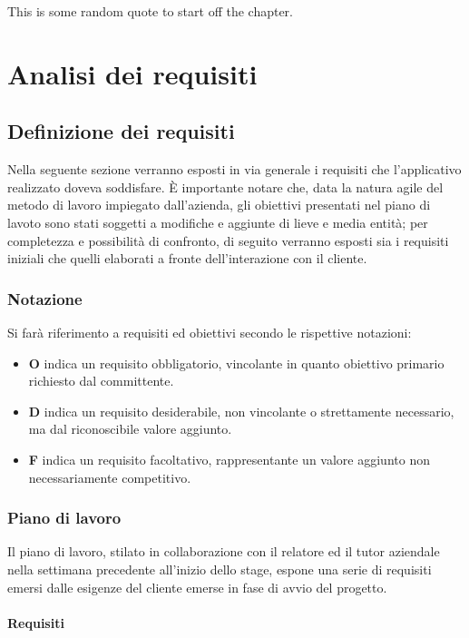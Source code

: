 
\begin{savequote}[75mm]
This is some random quote to start off the chapter.
\end{savequote}
\chapter{Analisi dei requisiti}
\section{Definizione dei requisiti}
Nella seguente sezione verranno esposti in via generale i requisiti che l'applicativo realizzato doveva soddisfare. È importante notare che, data la natura agile del metodo di lavoro impiegato dall'azienda, gli obiettivi presentati nel piano di lavoto sono stati soggetti a modifiche e aggiunte di lieve e media entità; per completezza e possibilità di confronto, di seguito verranno esposti sia i requisiti iniziali che quelli elaborati a fronte dell'interazione con il cliente.
\subsection{Notazione}
Si farà riferimento a requisiti ed obiettivi secondo le rispettive notazioni:
\begin{itemize}
    \item \textbf{O} indica un requisito obbligatorio, vincolante in quanto obiettivo primario richiesto dal committente.
    \item \textbf{D} indica un requisito desiderabile, non vincolante o strettamente necessario, ma dal riconoscibile valore aggiunto.
    \item \textbf{F} indica un requisito facoltativo, rappresentante un valore aggiunto non necessariamente competitivo.
\end{itemize}
\subsection{Piano di lavoro}
Il piano di lavoro, stilato in collaborazione con il relatore ed il tutor aziendale nella settimana precedente all'inizio dello stage, espone una serie di requisiti emersi dalle esigenze del cliente emerse in fase di avvio del progetto.
\subsubsection{Requisiti}
